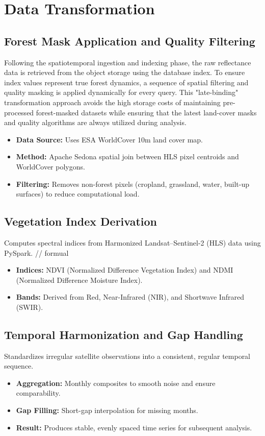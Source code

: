 \section{Data Transformation}
\label{sec:data_transformation}

\subsection{Forest Mask Application and Quality Filtering}
Following the spatiotemporal ingestion and indexing phase, the raw reflectance data is retrieved from the object storage using the database index. To ensure index values represent true forest dynamics, a sequence of spatial filtering and quality masking is applied dynamically for every query. This "late-binding" transformation approach avoids the high storage costs of maintaining pre-processed forest-masked datasets while ensuring that the latest land-cover masks and quality algorithms are always utilized during analysis.
\begin{itemize}
    \item \textbf{Data Source:} Uses ESA WorldCover 10m land cover map.
    \item \textbf{Method:} Apache Sedona spatial join between HLS pixel centroids and WorldCover polygons.
    \item \textbf{Filtering:} Removes non-forest pixels (cropland, grassland, water, built-up surfaces) to reduce computational load.
\end{itemize}

\subsection{Vegetation Index Derivation}
\label{subsec:vi_derivation}
Computes spectral indices from Harmonized Landsat--Sentinel-2 (HLS) data using PySpark.
// formual
\begin{itemize}
    \item \textbf{Indices:} NDVI (Normalized Difference Vegetation Index) and NDMI (Normalized Difference Moisture Index).
    \item \textbf{Bands:} Derived from Red, Near-Infrared (NIR), and Shortwave Infrared (SWIR).
\end{itemize}

\subsection{Temporal Harmonization and Gap Handling}
Standardizes irregular satellite observations into a consistent, regular temporal sequence.
\begin{itemize}
    \item \textbf{Aggregation:} Monthly composites to smooth noise and ensure comparability.
    \item \textbf{Gap Filling:} Short-gap interpolation for missing months.
    \item \textbf{Result:} Produces stable, evenly spaced time series for subsequent analysis.
\end{itemize}

